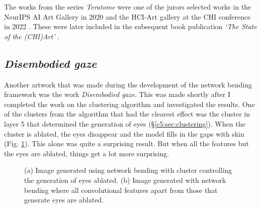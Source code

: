 The works from the series \textit{Teratome} were one of the jurors selected works in the NeurIPS AI Art Gallery in 2020 \citep{broad2020teratome} and the HCI-Art gallery at the CHI conference in 2022 \citep{perry2022art}. 
These were later included in the subsequent book publication \textit{`The State of the (CHI)Art'} \citep{sturdee2023chiart}. 

\subsection{\textit{Disembodied gaze}}
\label{c7:subsubsec:disembodied}

Another artwork that was made during the development of the network bending framework was the work \textit{Disembodied gaze}. 
This was made shortly after I completed the work on the clustering algorithm and investigated the results. 
One of the clusters from the algorithm that had the clearest effect was the cluster in layer 5 that determined the generation of eyes (\S \ref{c5:sec:clustering}). 
When the cluster is ablated, the eyes disappear and the model fills in the gaps with skin  (Fig. \ref{fig:c7:eyes-no-eyes}). 
This alone was quite a surprising result. But when all the features but the eyes are ablated, things get a lot more surprising. 

\begin{figure}[!htbp]
    \hfill
    \hfill
    \caption[Network bending eye cluster comparison]{(a) Image generated using network bending with cluster controlling the generation of eyes ablated. (b) Image generated with network bending where all convolutional features apart from those that generate eyes are ablated.}
    \label{fig:c7:eyes-no-eyes}
 \end{figure}

